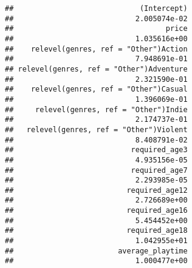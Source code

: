 \documentclass[]{article}
\newenvironment{Shaded}{\begin{snugshade}}{\end{snugshade}}
\newcommand{\KeywordTok}[1]{\textcolor[rgb]{0.13,0.29,0.53}{\textbf{#1}}}
\newcommand{\NormalTok}[1]{#1}
\newcommand{\OperatorTok}[1]{\textcolor[rgb]{0.81,0.36,0.00}{\textbf{#1}}}
\begin{document}
\begin{Shaded}
\end{Shaded}

\begin{verbatim}
##                             (Intercept) 
##                            2.005074e-02 
##                                   price 
##                            1.035616e+00 
##    relevel(genres, ref = "Other")Action 
##                            7.948691e-01 
## relevel(genres, ref = "Other")Adventure 
##                            2.321590e-01 
##    relevel(genres, ref = "Other")Casual 
##                            1.396069e-01 
##     relevel(genres, ref = "Other")Indie 
##                            2.174737e-01 
##   relevel(genres, ref = "Other")Violent 
##                            8.408791e-02 
##                           required_age3 
##                            4.935156e-05 
##                           required_age7 
##                            2.293985e-05 
##                          required_age12 
##                            2.726689e+00 
##                          required_age16 
##                            5.454452e+00 
##                          required_age18 
##                            1.042955e+01 
##                        average_playtime 
##                            1.000477e+00
\end{verbatim}
\end{document}
